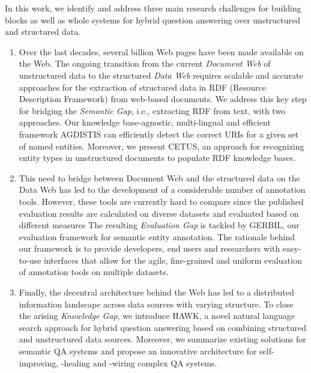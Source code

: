 In this work, we identify and address three main research challenges for building blocks as well as whole systems for hybrid question answering over unstructured and structured data.
\begin{enumerate}
\item 
Over the last decades, several billion Web pages have been made available on the Web. 
The ongoing transition from the current \emph{Document Web} of unstructured data to the structured \emph{Data Web} requires scalable and accurate approaches for the extraction of structured data in RDF (Resource Description Framework) from web-based documents.
We address this key step for bridging the \emph{Semantic Gap}, i.e., extracting RDF from text,  with two approaches.
Our knowledge base-agnostic, multi-lingual and efficient framework AGDISTIS can efficiently detect the correct URIs for a given set of named entities.
Moreover, we present CETUS, an approach for recognizing entity types in unstructured documents to populate RDF knowledge bases. 
\item 
This need to bridge between Document Web and the structured data on the Data Web has led to the development of a considerable number of annotation tools. However, these tools are currently hard to compare since the published evaluation results are calculated on diverse datasets and evaluated based on different measures
The resulting \emph{Evaluation Gap} is tackled by GERBIL, our evaluation framework for semantic entity annotation. 
The rationale behind our framework is to provide developers, end users and researchers with easy-to-use interfaces that allow for the agile, fine-grained and uniform evaluation of annotation tools on multiple datasets.
\item 
Finally, the decentral architecture behind the Web has led to a distributed information landscape across data sources with varying structure. 
To close the arising \emph{Knowledge Gap}, we introduce HAWK, a novel natural language search approach for hybrid question answering based on combining structured and unstructured data sources.
Moreover, we summarize existing solutions for semantic QA systems and propose an innovative architecture for self-improving, -healing and -wiring complex QA systems.
\end{enumerate}
